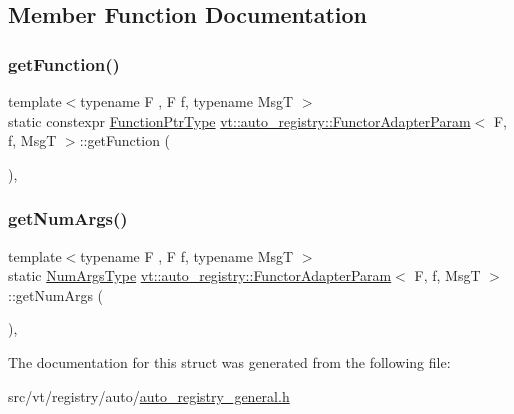 \subsection{Member Function Documentation}
\mbox{\label{structvt_1_1auto__registry_1_1_functor_adapter_param_a370a6ead9ce6032a4fb73cd199491702}} 
\subsubsection{\texorpdfstring{get\+Function()}{getFunction()}}
{\footnotesize\ttfamily template$<$typename F , F f, typename MsgT $>$ \\
static constexpr \hyperlink{structvt_1_1auto__registry_1_1_functor_adapter_param_a265b01cc62bfbdd828d8e69d98391577}{Function\+Ptr\+Type} \hyperlink{structvt_1_1auto__registry_1_1_functor_adapter_param}{vt\+::auto\+\_\+registry\+::\+Functor\+Adapter\+Param}$<$ F, f, MsgT $>$\+::get\+Function (\begin{DoxyParamCaption}{ }\end{DoxyParamCaption})\hspace{0.3cm}{\ttfamily [inline]}, {\ttfamily [static]}}

\mbox{\label{structvt_1_1auto__registry_1_1_functor_adapter_param_a668d91eaa8c7f8ca694c7ec61234aad3}} 
\subsubsection{\texorpdfstring{get\+Num\+Args()}{getNumArgs()}}
{\footnotesize\ttfamily template$<$typename F , F f, typename MsgT $>$ \\
static \hyperlink{namespacevt_1_1auto__registry_aebda1d9d765bc9147dc654ad0712c936}{Num\+Args\+Type} \hyperlink{structvt_1_1auto__registry_1_1_functor_adapter_param}{vt\+::auto\+\_\+registry\+::\+Functor\+Adapter\+Param}$<$ F, f, MsgT $>$\+::get\+Num\+Args (\begin{DoxyParamCaption}{ }\end{DoxyParamCaption})\hspace{0.3cm}{\ttfamily [inline]}, {\ttfamily [static]}}



The documentation for this struct was generated from the following file\+:\begin{DoxyCompactItemize}
\item 
src/vt/registry/auto/\hyperlink{auto__registry__general_8h}{auto\+\_\+registry\+\_\+general.\+h}\end{DoxyCompactItemize}

